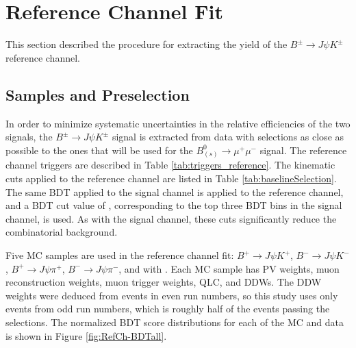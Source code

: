 \section{Reference Channel Fit}
\label{sec:ReferenceChannel}

This section described the procedure for extracting the yield of the $B^{\pm}\to J\psi K^\pm$ reference channel. 
\subsection{Samples and Preselection}
\label{subsec:refSamples}

In order to minimize systematic uncertainties in the relative efficiencies of the two signals, the $B^{\pm}\to J\psi K^\pm$ signal is extracted from data with selections as close as possible to the ones that will be used for the $B^{0}_{(s)}\to \mu^+ \mu^-$ signal. The reference channel triggers are described in Table \ref{tab:triggers_reference}. The kinematic cuts applied to the reference channel are listed in Table \ref{tab:baselineSelection}. The same BDT applied to the signal channel is applied to the reference channel, and a BDT cut value of , corresponding to the top three BDT bins in the signal channel, is used. As with the signal channel, these cuts significantly reduce the combinatorial background. 

Five MC samples are used in the reference channel fit: $B^{+}\to J\psi K^{+}$, $B^{-}\to J\psi K^{-}$, $B^{+}\to J\psi \pi^{+}$, $B^{-}\to J\psi \pi^{-}$, and \bbJpsiX with \JpsiMuMu. Each MC sample has PV weights, muon reconstruction weights, muon trigger weights, QLC, and DDWs. The DDW weights were deduced from events in even run numbers, so this study uses only events from odd run numbers, which is roughly half of the events passing the selections. The normalized BDT score distributions for each of the MC and data is shown in Figure \ref{fig:RefCh-BDTall}. 


